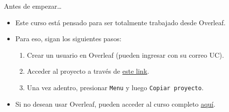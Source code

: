 \documentclass[11pt, handout]{beamer}
\begin{document}
\begin{frame}{Antes de empezar\ldots}
	\begin{itemize}
		\item Este curso está pensado para ser totalmente trabajado desde Overleaf.
		\vfill
		
		\item Para eso, sigan los siguientes pasos:\smallskip
			\begin{enumerate}
				\item Crear un usuario en Overleaf (pueden ingresar con su correo UC).\smallskip
				
				\item Acceder al proyecto a través de \href{https://www.overleaf.com/read/fxyhkqyndsrx}{este link}.\smallskip
				
				\item Una vez adentro, presionar \texttt{Menu} y luego \texttt{Copiar proyecto}.
				
				
			\end{enumerate}
		\vfill
		
		\item Si no desean usar Overleaf, pueden acceder al curso completo \href{https://github.com/pipeton8/latex-course}{aquí}. 
	\end{itemize}

\end{frame}
\end{document}
